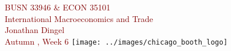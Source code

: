 \documentclass[10pt,notes=hide]{beamer}
\begin{document}
\begin{frame}[plain]
\begin{center}
\large
\textcolor{maroon}{BUSN 33946 \& ECON 35101\\
International Macroeconomics and Trade\\ 
Jonathan Dingel\\
Autumn \the\year, Week 6}
\vfill 
\texttt{[image: ../images/chicago\_booth\_logo]}
\end{center}
\end{frame}
\begin{comment}
\begin{frame}{Before we get started}
\begin{itemize}
	\item Today we're talking about trade with increasing returns, but let's talk about the DFS '77 assignment briefly.
\item Recall our friends
$A(z) \equiv \frac{a^*(z)}{a(z)}$
and
$B(z) \equiv \frac{\theta(z)}{1-\theta(z)}\frac{L^{*}}{L}$
\item Equilibrium relative wage $\omega \equiv \frac{w}{w^*}$ is where $A\left(\tilde{z}\right)=B\left(\tilde{z}\right)$
\item Can you vary the $A()$ function such that equilibria exhibit the same volume of trade and different gains from trade?
\end{itemize}
\begin{align*}
	\ln (U/L) 
	&=
	{\ln w} - \int_{0}^{1} b(z) \ln p(z) dz
	\\
	\int_{0}^{1} b(z) \ln a(z) dz 
	&\geq \int_{0}^{\tilde{z}} b(z) \ln a(z) dz + \int_{\tilde{z}}^{1} b(z) \ln \left[w^{*} a^{*}(z)\right] dz 
	\\
	0
	&\geq
	\int_{\tilde{z}}^{1} b(z) \ln \left[A(z) / \omega\right] dz
\end{align*}
What can be said about the magnitude of the gains from trade in this model if we observe the equilibrium volume of trade and do not observe autarky prices?
\end{frame}
\end{comment}
\end{document}
